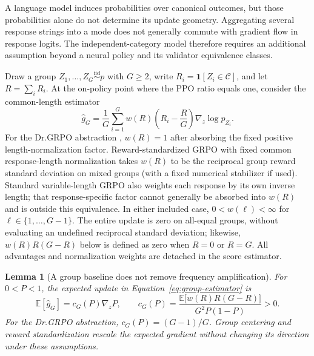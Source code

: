 \documentclass{article}
\newcommand{\enforcehalffinalproseline}{%
  \setlength{\parfillskip}{0pt plus .20\linewidth}}
\newcommand{\1}{\mathbf 1}
\newcommand{\E}{\mathbb E}
\newtheorem{lemma}{Lemma}[section]
\theoremstyle{remark}
\theoremstyle{definition}
\theoremstyle{plain}
\begin{document}
A language model induces probabilities over canonical outcomes, but those
probabilities alone do not determine its update geometry. Aggregating several
response strings into a mode does not generally commute with gradient flow
in response logits. The independent-category model therefore requires an
additional assumption beyond a neural policy and its validator equivalence
classes.

Draw a group $Z_1,\ldots,Z_G\stackrel{\mathrm{iid}}{\sim}p$ with $G\ge2$,
write $R_i=\1[Z_i\in\mathcal C]$, and let $R=\sum_iR_i$. At the on-policy
point where the PPO ratio equals one, consider the common-length estimator
\begin{equation}
  \widehat g_G
  =\frac1G\sum_{i=1}^G
   w(R)\left(R_i-\frac{R}{G}\right)\nabla_z\log p_{Z_i}.
  \label{eq:group-estimator}
\end{equation}
For the Dr.GRPO abstraction \citep{liu2025understanding}, $w(R)=1$ after
absorbing the fixed positive length-normalization factor. Reward-standardized
GRPO \citep{shao2024deepseekmath} with fixed common response-length
normalization takes $w(R)$ to be the reciprocal group reward standard
deviation on mixed groups (with a fixed numerical stabilizer if used).
Standard variable-length GRPO also weights each response by its own inverse
length; that response-specific factor cannot generally be absorbed into
$w(R)$ and is outside this equivalence.
In either included case, $0<w(\ell)<\infty$ for
$\ell\in\{1,\ldots,G-1\}$. The entire update is zero on all-equal
groups, without evaluating an undefined reciprocal standard deviation;
likewise, $w(R)R(G-R)$ below is defined as zero when $R=0$ or $R=G$. All
advantages and normalization weights are detached in the score estimator.

\begin{lemma}[A group baseline does not remove frequency amplification]
\enforcehalffinalproseline
\label{lem:grpo-mean}
For $0<P<1$, the expected update in Equation~\eqref{eq:group-estimator} is
\begin{equation}
  \E[\widehat g_G]
  =c_G(P)\nabla_z P,
  \qquad
  c_G(P)=
  \frac{\E\!\big[w(R)R(G-R)\big]}{G^2P(1-P)}>0.
  \label{eq:expected-group-gradient}
\end{equation}
For the Dr.GRPO abstraction, $c_G(P)=(G-1)/G$. Group centering and reward
standardization rescale the expected gradient without changing its direction
under these assumptions.
\end{lemma}
\end{document}
